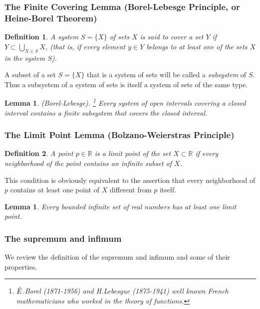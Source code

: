 \documentclass[a4paper,12pt]{article} %
\newtheorem{definition}{Definition}[section]
\newtheorem{lemma}[theorem]{Lemma}
\begin{document}
\subsubsection{The Finite Covering Lemma (Borel-Lebesge Principle,
or Heine-Borel Theorem)}
\begin{definition}
    A system $S=\{X\}$ of sets $X$ is said to cover a set $Y$ if 
    $\displaystyle Y \subset \bigcup_{X \in S} X$, (that is, if every element 
    $y\in Y$ belongs to at least one of the sets $X$ in the system $S$).
\end{definition}

A subset of a set $S = \{X\}$ that is a system of sets will be called 
a \textit{subsystem} of $S$. Thus a subsystem of a system of sets is itself a
system of sets of the same type.

\begin{lemma}{\rm (Borel-Lebesge)}. \footnote{$\Acute{E}$.Borel 
    (1871-1956) and H.Lebesgue (1875-1941) well known French 
    mathematicians who worked in the theory of functions.}
     Every system of open intervals covering a closed interval 
     contains a finite subsystem that covers the closed interval.
\end{lemma}

\subsubsection{The Limit Point Lemma (Bolzano-Weierstras Principle)}
\begin{definition}
    A point $p\in \mathbb{R}$ is a \textit{limit point} of the set $X \subset \mathbb{R} $
    if every neighborhood of the point contains an infinite subset of $X$.
\end{definition}

    This condition is obviously equivalent to the assertion that 
    every neighborhood of $p$ contains at least one point of $X$ different from 
    $p$ itself.

\begin{lemma}
    Every bounded infinite set of real numbers has at least one limit point.
\end{lemma}

\subsubsection{The supremum and infimum}
We review the definition of the supremum and infimum and 
some of their properties.
\end{document}
